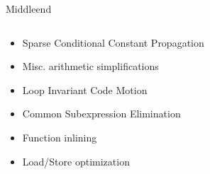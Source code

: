 \documentclass[en,16:9]{sdqbeamer}
\begin{document}
\begin{frame}{Middleend}
	\begin{columns}
		\begin{column}{0.4\linewidth}
			\begin{itemize}
				\item Sparse Conditional Constant Propagation
				\item Misc. arithmetic simplifications
				\item Loop Invariant Code Motion
				\item Common Subexpression Elimination
				\item Function inlining
				\item Load/Store optimization
			\end{itemize}%
		\end{column}


\end{columns}
\end{frame}
\end{document}

